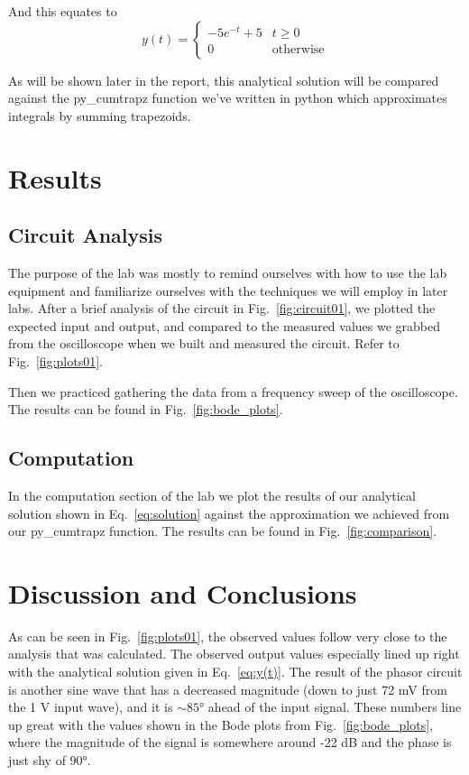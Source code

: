 \documentclass[11pt]{texMemo-gibbons}
\begin{document}
And this equates to 
\begin{equation}
  y(t) = 
  \begin{cases}
    -5e^{-t}+5 & t \geq 0 \\
    0 & \text{otherwise}
  \end{cases}
  \label{eq:solution}
\end{equation}


As will be shown later in the report, this analytical
solution will be compared against the py\_cumtrapz function
we've written in python which approximates integrals
by summing trapezoids.

\section{Results}
\label{sec:results}

\subsection{Circuit Analysis}

The purpose of the lab was mostly to remind ourselves
with how to use the lab equipment and familiarize ourselves
with the techniques we will employ in later labs. After
a brief analysis of the circuit in Fig.~\ref{fig:circuit01},
we plotted the expected input and output, and compared
to the measured values we grabbed from the oscilloscope
when we built and measured the circuit. Refer to Fig.~\ref{fig:plots01}.

Then we practiced gathering the data from a frequency sweep of the
oscilloscope. The results can be found in Fig.~\ref{fig:bode_plots}.

\subsection{Computation}

In the computation section of the lab we plot the results
of our analytical solution shown in Eq.~\ref{eq:solution}
against the approximation we achieved from our py\_cumtrapz
function. The results can be found in Fig.~\ref{fig:comparison}.


\section{Discussion and Conclusions}
\label{sec:conclusions}

As can be seen in Fig.~\ref{fig:plots01}, the observed
values follow very close to the analysis that was calculated.
The observed output values especially lined up right
with the analytical solution given in Eq.~\ref{eq:y(t)}.
The result of the phasor circuit is another sine wave
that has a decreased magnitude (down to just 72 mV from
the 1 V input wave), and it is $\sim\ang{85}$ ahead
of the input signal. These numbers line up great with the 
values shown in the Bode plots from Fig.~\ref{fig:bode_plots}, where
the magnitude of the signal is somewhere around -22 dB and the phase
is just shy of $\ang{90}$.
\end{document}
